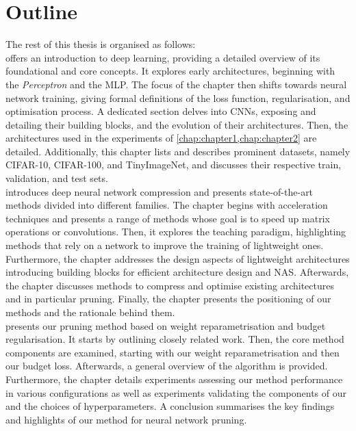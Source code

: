 \section{Outline}

The rest of this thesis is organised as follows:\\

 offers an introduction to deep learning, providing a detailed
overview of its foundational and core concepts. It \DIFaddbegin {}\DIFaddend explores early
architectures, beginning with the \emph{Perceptron} and the \ac{MLP}. The focus
of the chapter then shifts towards neural network training, giving formal
definitions of the loss function, regularisation, and optimisation process. A
dedicated section delves into \aclp{CNN}, exposing and detailing their building
blocks, and the evolution of their architectures. Then, the architectures used
in the experiments of \cref{chap:chapter1,chap:chapter2} are detailed.
Additionally, this chapter lists and describes prominent datasets, namely
CIFAR-10, CIFAR-100, and TinyImageNet, and discusses their respective train,
validation, and test sets.\\

 introduces deep neural network compression and presents
state-of-the-art methods divided into different families. The chapter begins
with acceleration techniques and presents a range of methods whose goal is to
speed up matrix operations or convolutions. Then, it explores the teaching
paradigm, highlighting methods that rely on a \DIFdelbegin {}\DIFdelend \DIFaddbegin {}\DIFaddend network to
improve the training of lightweight ones. Furthermore, the chapter addresses the
design aspects of lightweight architectures introducing building blocks for
efficient architecture design and \acl{NAS}. Afterwards, the chapter discusses
methods to compress and optimise existing architectures and in particular
pruning. Finally, the chapter presents the positioning of our methods and the
rationale behind them.\\

 presents our pruning method based on weight
reparametrisation and budget regularisation. It starts by outlining closely
related work. Then, the core method components are examined, starting with our
weight reparametrisation and then our budget loss. Afterwards, a general
overview of the algorithm is provided. Furthermore, the chapter details
experiments assessing our method performance in various configurations as well
as experiments validating the components of our \DIFdelbegin {}\DIFdelend \DIFaddbegin {}\DIFaddend and the choices of
hyperparameters. A conclusion summarises the key findings and highlights of our
method for neural network pruning.\\

